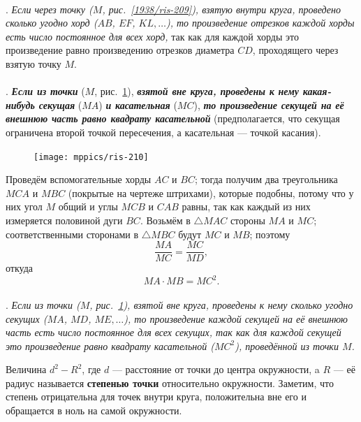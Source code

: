 \documentclass[twoside]{book}
\makeatletter
\newcommand{\rindex}[2][\imki@jobname]{%
  \index[#1]{\detokenize{#2}}%
}
\makeatother
\begin{document}
\paragraph{}\label{1938/200}
.
\emph{Если через точку \emph{($M$, рис.~\ref{1938/ris-209}),} взятую внутри круга, проведено сколько угодно хорд ($AB$, $EF$, $KL,\dots$), то произведение отрезков каждой хорды есть число постоянное для всех хорд,} так как для каждой хорды это произведение равно произведению отрезков диаметра $CD$, проходящего через взятую точку $M$.

\paragraph{}\label{1938/201}
.
\textbf{\emph{Если из точки}} ($M$, рис.~\ref{1938/ris-210}), \textbf{\emph{взятой вне круга, проведены к нему какая-нибудь секущая}} ($MA$) \textbf{\emph{и касательная}} ($MC$), \textbf{\emph{то произведение секущей на её внешнюю часть равно квадрату касательной}} (предполагается, что секущая ограничена второй точкой пересечения, а касательная — точкой касания).

\begin{figure}
\centering
\texttt{[image: mppics/ris-210]}
\caption{}\label{1938/ris-210}
\end{figure}

Проведём вспомогательные хорды $AC$ и $BC$;
тогда получим два треугольника $MCA$ и $MBC$ (покрытые на чертеже штрихами), которые подобны, потому что у них угол $M$ общий и углы $MCB$ и $CAB$ равны, так как каждый из них измеряется половиной дуги $BC$.
Возьмём в $\triangle MAC$ стороны $MA$ и $MC$;
соответственными сторонами в $\triangle MBC$ будут $MC$ и $MB$;
поэтому
\[\frac{MA}{MC} = \frac{MC}{MD},\]
откуда
\[MA\cdot MB=MC^2.\]

\paragraph{}\label{1938/202}
\mbox{.}
\emph{Если из точки \emph{($M$, рис.~\ref{1938/ris-210}),} взятой вне круга, проведены к нему сколько угодно секущих ($MA$, $MD$, $ME,\dots$), то произведение каждой секущей на её внешнюю часть есть число постоянное для всех секущих, так как для каждой секущей это произведение равно квадрату касательной ($MC^2$), проведённой из точки $M$.}


Величина $d^2- R^2$, где $d$ — расстояние от точки до центра окружности, a $R$ — её радиус называется \rindex{степень точки}\textbf{степенью точки} относительно окружности.
Заметим, что степень отрицательна для точек внутри круга,
положительна вне его и обращается в ноль на самой окружности.
\end{document}
